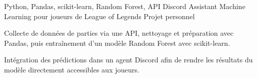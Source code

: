 
\begin{cventries}
  \cventry
    {Python, Pandas, scikit-learn, Random Forest, API Discord}
    {Assistant Machine Learning pour joueurs de League of Legends}
    {Projet personnel}
    {}
    {
      \begin{cvitems}
        \item {Collecte de données de parties via une API, nettoyage et préparation avec Pandas, puis entraînement d’un modèle Random Forest avec scikit-learn.}
        \item {Intégration des prédictions dans un agent Discord afin de rendre les résultats du modèle directement accessibles aux joueurs.}
      \end{cvitems}
    }
\end{cventries}
